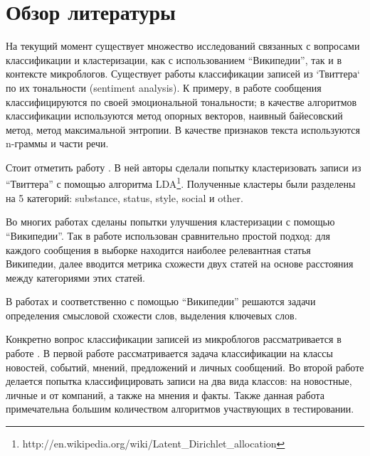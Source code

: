 \chapter{Обзор литературы}
\label{chap:bib}
На текущий момент существует множество исследований связанных с вопросами классификации и кластеризации, как с использованием ``Википедии'', так и в контексте микроблогов. Существует работы классификации записей из `Твиттера` по их тональности (sentiment analysis). К примеру, в работе \cite{Go_Bhayani_Huang_2009} сообщения классифицируются по своей эмоциональной тональности; в качестве алгоритмов классификации используются метод опорных векторов, наивный байесовский метод, метод максимальной энтропии. В качестве признаков текста используются n-граммы и части речи.

Стоит отметить работу \cite{ramage2010characterizing}. В ней авторы сделали попытку кластеризовать записи из ``Твиттера'' с помощью алгоритма LDA\footnote{http://en.wikipedia.org/wiki/Latent\_Dirichlet\_allocation}. Полученные кластеры были разделены на 5 категорий: substance, status, style, social и other. 
 
Во многих работах сделаны попытки улучшения кластеризации с помощью ``Википедии''. Так в работе \cite{Genc:2011:DCC:2021773.2021833} использован сравнительно простой подход: для каждого сообщения в выборке находится наиболее релевантная статья Википедии, далее вводится метрика схожести двух статей на основе расстояния между категориями этих статей. %

В работах \cite{Gabrilovich:2009:WSI:1622716.1622728} и \cite{Milne:2008:LLW:1458082.1458150} соответственно с помощью ``Википедии'' решаются задачи определения смысловой схожести слов, выделения ключевых слов.

Конкретно вопрос классификации записей из микроблогов рассматривается в работе \cite{Sriram:2010:STC:1835449.1835643, Horn_2010}. В первой работе рассматривается задача классификации на классы новостей, событий, мнений, предложений и личных сообщений. Во второй работе делается попытка классифицировать записи на два вида классов: на новостные, личные и от компаний, а также на мнения и факты. Также данная работа примечательна большим количеством алгоритмов участвующих в тестировании. 
